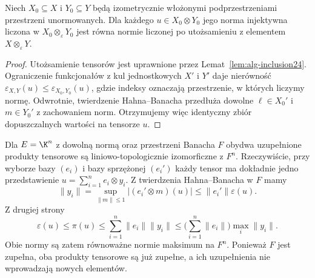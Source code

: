 \begin{twierdzenie}
\label{thm:eps-injective24}
Niech $X_0\subseteq X$ i $Y_0\subseteq Y$ będą izometrycznie
włożonymi podprzestrzeniami przestrzeni unormowanych.
Dla każdego $u\in X_0\otimes Y_0$ jego norma injektywna
liczona w $X_0\otimes_\varepsilon Y_0$ jest równa normie
liczonej po utożsamieniu z elementem $X\otimes_\varepsilon Y$.
\end{twierdzenie}
\begin{proof}
Utożsamienie tensorów jest uprawnione przez
Lemat~\ref{lem:alg-inclusion24}.
Ograniczenie funkcjonałów z kul jednostkowych $X'$ i $Y'$
daje nierówność $\varepsilon_{X,Y}(u)\le
\varepsilon_{X_0,Y_0}(u)$, gdzie indeksy oznaczają
przestrzenie, w których liczymy normę. Odwrotnie, twierdzenie
Hahna--Banacha przedłuża dowolne $\ell\in X_0'$
i $m\in Y_0'$ z zachowaniem norm. Otrzymujemy więc
identyczny zbiór dopuszczalnych wartości na tensorze $u$.
\end{proof}

\begin{przyklad}
\label{ex:finite-dim24}
Dla $E=\K^n$ z dowolną normą oraz przestrzeni Banacha $F$
obydwa uzupełnione produkty tensorowe są liniowo-topologicznie
izomorficzne z $F^n$. Rzeczywiście, przy wyborze bazy
$(e_i)$ i bazy sprzężonej $(e_i')$ każdy tensor ma dokładnie
jedno przedstawienie $u=\sum_{i=1}^ne_i\otimes y_i$.
Z twierdzenia Hahna--Banacha w $F$ mamy
\[
 \|y_i\|=\sup_{\|m\|\le1}|(e_i'\otimes m)(u)|
 \le\|e_i'\|\varepsilon(u).
\]
Z drugiej strony
\[
 \varepsilon(u)\le\pi(u)\le\sum_{i=1}^n\|e_i\|\|y_i\|
 \le\Big(\sum_{i=1}^n\|e_i\|\Big)\max_i\|y_i\|.
\]
Obie normy są zatem równoważne normie maksimum na $F^n$.
Ponieważ $F$ jest zupełna, oba produkty tensorowe są już
zupełne, a ich uzupełnienia nie wprowadzają nowych elementów.
\end{przyklad}

